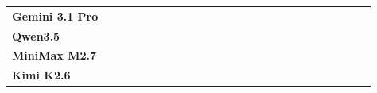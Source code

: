 \documentclass{article}
\begin{document}
\begin{table}[h]
{\begin{tabular}{lcccccccccccccccccccccccc}
\textbf{Gemini 3.1 Pro}
&  &  &  &
&  &  &
&  &
&  &  &  &
&  &  &  &
&  &  &
&  &
&  &  \\


\textbf{Qwen3.5}
&  &  &  &
&  &  &
&  &
&  &  &  &
&  &  &  &
&  &  &
&  &
&  &  \\

\textbf{MiniMax M2.7}
&  &  &  &
&  &  &
&  &
&  &  &  &
&  &  &  &
&  &  &
&  &
&  &  \\


\textbf{Kimi K2.6}
&  &  &  &
&  &  &
&  &
&  &  &  &
&  &  &  &
&  &  &
&  &
&  &  \\


\bottomrule
\end{tabular}%
}
\label{tab:baseline_domain_scenarios}
\end{table}




\newpage




\clearpage





\medskip


{

}



\appendix



\newpage


\newpage

\end{document}
